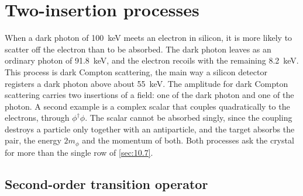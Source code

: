 \section{Two-insertion processes}\label{sec:10.8}

When a dark photon of \SI{100}{keV} meets an electron in silicon, it is more likely to scatter off the electron than to be absorbed. The dark photon leaves as an ordinary photon of \SI{91.8}{keV}, and the electron recoils with the remaining \SI{8.2}{keV}. This process is dark Compton scattering, the main way a silicon detector registers a dark photon above about \SI{55}{keV}. The amplitude for dark Compton scattering carries two insertions of a field: one of the dark photon and one of the photon. A second example is a complex scalar that couples quadratically to the electrons, through $\phi^\dagger\phi$. The scalar cannot be absorbed singly, since the coupling destroys a particle only together with an antiparticle, and the target absorbs the pair, the energy $2m_\phi$ and the momentum of both. Both processes ask the crystal for more than the single row of \cref{sec:10.7}.

\subsection{Second-order transition operator}\label{sec:10.8-rate}

